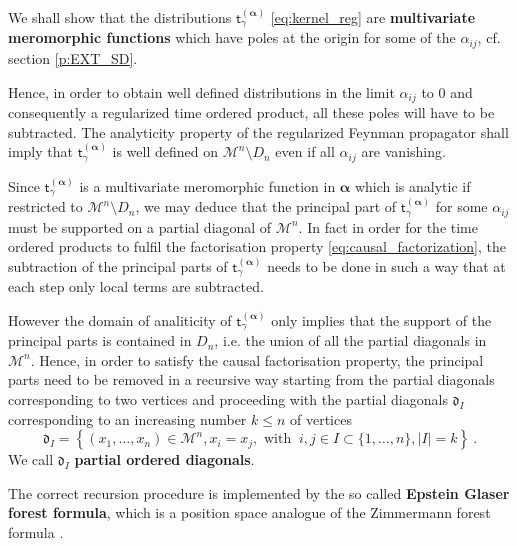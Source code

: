 \documentclass[11pt]{book}
\newcommand{\alphabd}{\boldsymbol{\alpha}}
\newcommand{\abs}[1]{\left|#1\right|}
\newcommand{\Mcal}{\mathcal{M}}
\newcommand{\drak}{\mathfrak{d}}
\newcommand{\tsf}{\mathsf{t}}
\theoremstyle{break}
\begin{document}
\bigskip


We shall show that the distributions $\tsf^{(\alphabd)}_\gamma$ \eqref{eq:kernel_reg} are \textbf{multivariate meromorphic functions} which have poles at the origin for some of the $\alpha_{ij}$, cf. section \ref{p:EXT_SD}. 


Hence, in order to obtain well defined distributions in the limit $\alpha_{ij}$ to $0$ and consequently a regularized time ordered product, all these poles will have to be subtracted. The analyticity property of the regularized Feynman propagator shall imply that $\tsf^{(\alphabd)}_\gamma$ is well defined on $ \Mcal^n \setminus D_n $ even if all $\alpha_{ij}$ are vanishing. 


Since $\tsf^{(\alphabd)}_\gamma$ is a multivariate meromorphic function in $\alphabd$  which is analytic if restricted to $\Mcal^n\setminus D_n$, we may deduce that the principal part of $\tsf^{(\alphabd)}_\gamma$ for some $\alpha_{ij}$ must be supported on a partial diagonal of $\Mcal^n$. In fact in order for the time ordered products to fulfil the factorisation property \eqref{eq:causal_factorization}, the subtraction of the principal parts of $\tsf^{(\alphabd)}_\gamma$ needs to be done in such a way that at each step only local terms are subtracted. 

However the domain of analiticity of $\tsf^{(\alphabd)}_\gamma$ only implies that the support of the principal parts is contained in $D_n$, i.e. the union of all the partial diagonals in $\Mcal^n$. Hence, in order to satisfy the causal factorisation property, the principal parts need to be removed in a recursive way starting from the partial diagonals corresponding to two vertices and proceeding with the partial diagonals $\drak_{I}$ corresponding to an increasing number $k \leq n$ of vertices 
%
\begin{equation*}
\drak_{I} = \left\{ (x_1,\dots, x_n) \in \Mcal^n, x_i=x_j, \mbox{ with } \ i,j \in I\subset \{1,\dots, n\} , \abs{I} = k \right\} \ . 
\end{equation*}
%
We call $\drak_{I}$ \textbf{partial ordered diagonals}. 


\bigskip


The correct recursion procedure is implemented by the so called \textbf{Epstein Glaser forest formula}, which is a position space analogue of the Zimmermann forest formula \cite{duetsch_dimensional_2014}. 
\end{document}
